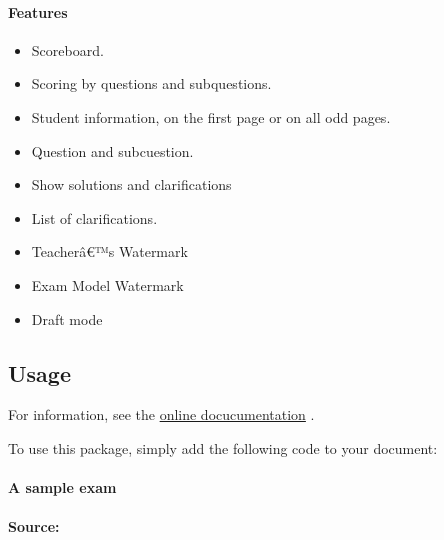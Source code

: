 \paragraph{Features}\label{features}

\begin{itemize}
\tightlist
\item
  Scoreboard.
\item
  Scoring by questions and subquestions.
\item
  Student information, on the first page or on all odd pages.
\item
  Question and subcuestion.
\item
  Show solutions and clarifications
\item
  List of clarifications.
\item
  Teacherâ€™s Watermark
\item
  Exam Model Watermark
\item
  Draft mode
\end{itemize}

\subsection{Usage}\label{usage}

For information, see the
\href{https://matheschool.github.io/typst-g-exam/}{online
docucumentation} .

To use this package, simply add the following code to your document:

\paragraph{A sample exam}\label{a-sample-exam}


\paragraph{Source:}\label{source}

